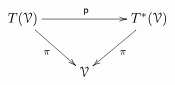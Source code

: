 \documentclass[spanish]{article}
\newcommand{\V}{\mathcal{V}}%
\begin{document}
\thispagestyle{empty}
$$
\xymatrix{
T(\V)\ar[rd]_\pi \ar[rr]^{\mathsf{p}}   &  &T^*(\V)\ar[ld]^\pi \\
   &   \V &
   }
$$
\end{document}
